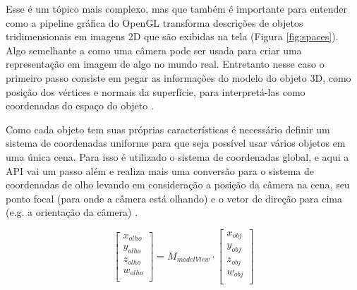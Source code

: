 \begin{figure}[htp]
	\centering
\end{figure}
\nocite{spaces}

Esse é um tópico mais complexo, mas que também é importante para entender como a pipeline gráfica do OpenGL transforma descrições de objetos tridimensionais em imagens 2D que são exibidas na tela (Figura \ref{fig:spaces}). Algo semelhante a como uma câmera pode ser usada para criar uma representação em imagem de algo no mundo real. Entretanto nesse caso o primeiro passo consiste em pegar as informações do modelo do objeto 3D, como posição dos vértices e normais da superfície, para interpretá-las como coordenadas do espaço do objeto \cite{GLSLBook}. 

Como cada objeto tem suas próprias características é necessário definir um sistema de coordenadas uniforme para que seja possível usar vários objetos em uma única cena. Para isso é utilizado o sistema de coordenadas global, e aqui a API vai um passo além e realiza mais uma conversão para o sistema de coordenadas de olho levando em consideração a posição da câmera na cena, seu ponto focal (para onde a câmera está olhando) e o vetor de direção para cima (e.g. a orientação da câmera) \cite{GLSLBook}. 

	\begin{equation}
		\begin{bmatrix}
			x_{olho} \\
			y_{olho} \\
			z_{olho} \\
			w_{olho} \\
		\end{bmatrix}
		=
		M_{modelView} \cdot
		\begin{bmatrix}
			x_{obj} \\
			y_{obj} \\
			z_{obj} \\
			w_{obj} \\
		\end{bmatrix}
	\end{equation}

